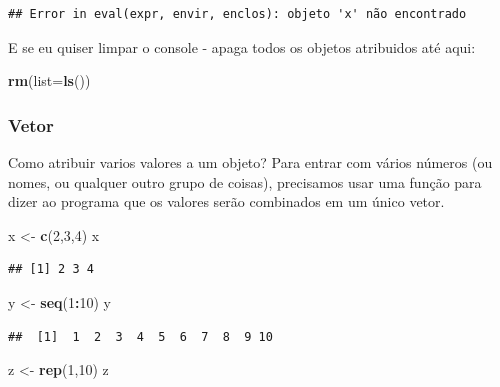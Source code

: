 \documentclass[
]{book}
\newenvironment{Shaded}{\begin{snugshade}}{\end{snugshade}}
\newcommand{\DataTypeTok}[1]{\textcolor[rgb]{0.13,0.29,0.53}{#1}}
\newcommand{\DecValTok}[1]{\textcolor[rgb]{0.00,0.00,0.81}{#1}}
\newcommand{\KeywordTok}[1]{\textcolor[rgb]{0.13,0.29,0.53}{\textbf{#1}}}
\newcommand{\NormalTok}[1]{#1}
\newcommand{\OperatorTok}[1]{\textcolor[rgb]{0.81,0.36,0.00}{\textbf{#1}}}
\newcommand{\StringTok}[1]{\textcolor[rgb]{0.31,0.60,0.02}{#1}}
\begin{document}
\begin{verbatim}
## Error in eval(expr, envir, enclos): objeto 'x' não encontrado
\end{verbatim}

E se eu quiser limpar o console - apaga todos os objetos atribuidos até aqui:

\begin{Shaded}
\begin{Highlighting}[]
\KeywordTok{rm}\NormalTok{(}\DataTypeTok{list=}\KeywordTok{ls}\NormalTok{())}
\end{Highlighting}
\end{Shaded}

\hypertarget{vetor}{%
\subsubsection{Vetor}\label{vetor}}

Como atribuir varios valores a um objeto? Para entrar com vários números (ou nomes, ou qualquer outro grupo de coisas), precisamos usar uma função para dizer ao programa que os valores serão combinados em um único vetor.

\begin{Shaded}
\begin{Highlighting}[]
\NormalTok{x <-}\StringTok{ }\KeywordTok{c}\NormalTok{(}\DecValTok{2}\NormalTok{,}\DecValTok{3}\NormalTok{,}\DecValTok{4}\NormalTok{)}
\NormalTok{x}
\end{Highlighting}
\end{Shaded}

\begin{verbatim}
## [1] 2 3 4
\end{verbatim}

\begin{Shaded}
\begin{Highlighting}[]
\NormalTok{y <-}\StringTok{ }\KeywordTok{seq}\NormalTok{(}\DecValTok{1}\OperatorTok{:}\DecValTok{10}\NormalTok{)}
\NormalTok{y}
\end{Highlighting}
\end{Shaded}

\begin{verbatim}
##  [1]  1  2  3  4  5  6  7  8  9 10
\end{verbatim}

\begin{Shaded}
\begin{Highlighting}[]
\NormalTok{z <-}\StringTok{ }\KeywordTok{rep}\NormalTok{(}\DecValTok{1}\NormalTok{,}\DecValTok{10}\NormalTok{)}
\NormalTok{z}
\end{Highlighting}
\end{Shaded}
\end{document}

